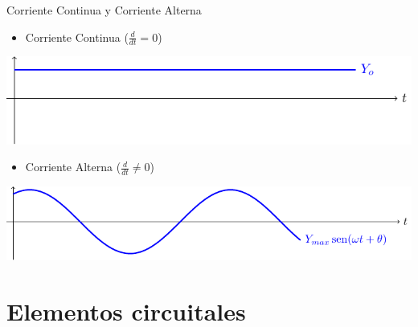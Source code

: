 \documentclass[aspectratio=169, usenames,svgnames,dvipsnames]{beamer}
\begin{document}
\begin{frame}[label={sec:orgaef56ed}]{Corriente Continua y Corriente Alterna}
\begin{itemize}
\item Corriente Continua (\(\frac{d}{dt} = 0\))
\end{itemize}
\begin{center}
\includegraphics[height=0.25\textheight]{../figs/continua.pdf}
\end{center}

\begin{itemize}
\item Corriente Alterna (\(\frac{d}{dt} \neq 0\))
\end{itemize}
\begin{center}
\includegraphics[height=0.25\textheight]{../figs/sin.pdf}
\end{center}
\end{frame}
\section{Elementos circuitales}
\label{sec:org0eaf171}
\end{document}
